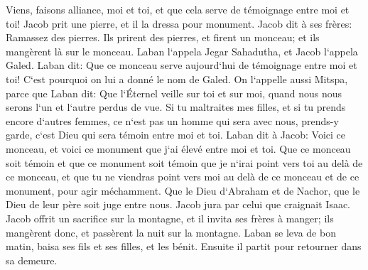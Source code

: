\verse Viens, faisons alliance, moi et toi, et que cela serve de témoignage entre moi et toi! 
\verse Jacob prit une pierre, et il la dressa pour monument. 
\verse Jacob dit à ses frères: Ramassez des pierres. Ils prirent des pierres, et firent un monceau; et ils mangèrent là sur le monceau. 
\verse Laban l`appela Jegar Sahadutha, et Jacob l`appela Galed. 
\verse Laban dit: Que ce monceau serve aujourd`hui de témoignage entre moi et toi! C`est pourquoi on lui a donné le nom de Galed. 
\verse On l`appelle aussi Mitspa, parce que Laban dit: Que l`Éternel veille sur toi et sur moi, quand nous nous serons l`un et l`autre perdus de vue. 
\verse Si tu maltraites mes filles, et si tu prends encore d`autres femmes, ce n`est pas un homme qui sera avec nous, prends-y garde, c`est Dieu qui sera témoin entre moi et toi. 
\verse Laban dit à Jacob: Voici ce monceau, et voici ce monument que j`ai élevé entre moi et toi. 
\verse Que ce monceau soit témoin et que ce monument soit témoin que je n`irai point vers toi au delà de ce monceau, et que tu ne viendras point vers moi au delà de ce monceau et de ce monument, pour agir méchamment. 
\verse Que le Dieu d`Abraham et de Nachor, que le Dieu de leur père soit juge entre nous. Jacob jura par celui que craignait Isaac. 
\verse Jacob offrit un sacrifice sur la montagne, et il invita ses frères à manger; ils mangèrent donc, et passèrent la nuit sur la montagne. 
\verse Laban se leva de bon matin, baisa ses fils et ses filles, et les bénit. Ensuite il partit pour retourner dans sa demeure. 

